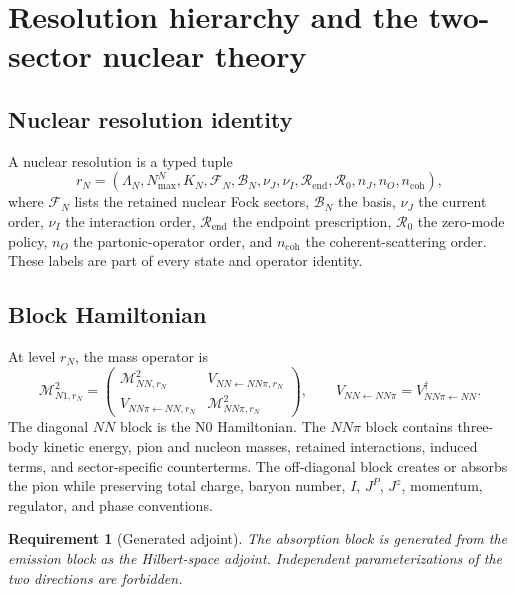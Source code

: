\documentclass[11pt]{article}
\newtheorem{requirement}[definition]{Requirement}
\newcommand{\cM}{\mathcal M}
\newcommand{\cF}{\mathcal F}
\newcommand{\cB}{\mathcal B}
\begin{document}
\section{Resolution hierarchy and the two-sector nuclear theory}
\label{sec:resolution}

\subsection{Nuclear resolution identity}

A nuclear resolution is a typed tuple
\begin{equation}
 r_N=
 \left(
 \Lambda_N,N_{\max}^{N},K_N,
 \cF_N,
 \cB_N,
 \nu_J,
 \nu_I,
 \mathcal R_{\mathrm{end}},
 \mathcal R_{0},
 n_J,n_O,n_{\mathrm{coh}}
 \right),
 \label{eq:nuclear-resolution}
\end{equation}
where \(\cF_N\) lists the retained nuclear Fock sectors, \(\cB_N\) the basis,
\(\nu_J\) the current order, \(\nu_I\) the interaction order,
\(\mathcal R_{\mathrm{end}}\) the endpoint prescription,
\(\mathcal R_0\) the zero-mode policy, \(n_O\) the partonic-operator order,
and \(n_{\mathrm{coh}}\) the coherent-scattering order.  These labels are part
of every state and operator identity.

\subsection{Block Hamiltonian}

At level \(r_N\), the mass operator is
\begin{equation}
 \cM_{N1,r_N}^{2}
 =
 \begin{pmatrix}
 \cM_{NN,r_N}^{2} & V_{NN\leftarrow NN\pi,r_N}\\
 V_{NN\pi\leftarrow NN,r_N} & \cM_{NN\pi,r_N}^{2}
 \end{pmatrix},
 \qquad
 V_{NN\leftarrow NN\pi}=V_{NN\pi\leftarrow NN}^{\dagger}.
 \label{eq:n1-hamiltonian}
\end{equation}
The diagonal \(NN\) block is the N0 Hamiltonian.  The \(NN\pi\) block contains
three-body kinetic energy, pion and nucleon masses, retained interactions,
induced terms, and sector-specific counterterms.  The off-diagonal block
creates or absorbs the pion while preserving total charge, baryon number,
\(I\), \(J^P\), \(J^z\), momentum, regulator, and phase conventions.

\begin{requirement}[Generated adjoint]
The absorption block is generated from the emission block as the Hilbert-space
adjoint.  Independent parameterizations of the two directions are forbidden.
\end{requirement}
\end{document}
